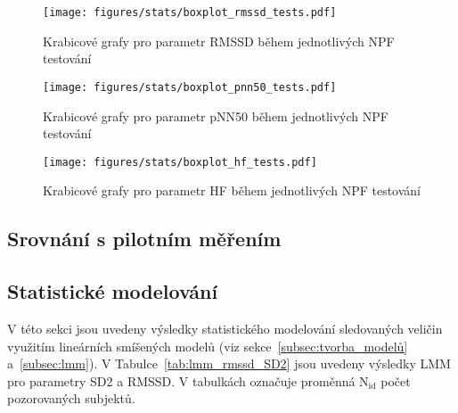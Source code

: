 \begin{figure}[H]
    \begin{center}
        \texttt{[image: figures/stats/boxplot\_rmssd\_tests.pdf]}
        \caption{Krabicové grafy pro parametr RMSSD během jednotlivých NPF testování}
        \label{fig:results_boxplot_rmssd_tests}
    \end{center}
    \vspace{-12mm}
\end{figure}
\begin{figure}[H]
    \begin{center}
        \texttt{[image: figures/stats/boxplot\_pnn50\_tests.pdf]}
        \caption{Krabicové grafy pro parametr pNN50 během jednotlivých NPF testování}
        \label{fig:results_boxplot_pnn50_tests}
    \end{center}
    \vspace{-12mm}
\end{figure}
\begin{figure}[H]
    \begin{center}
        \texttt{[image: figures/stats/boxplot\_hf\_tests.pdf]}
        \caption{Krabicové grafy pro parametr HF během jednotlivých NPF testování}
        \label{fig:results_boxplot_hf_tests}
    \end{center}
    \vspace{-20mm}
\end{figure}

\subsection{Srovnání s pilotním měřením}
\label{sec:result_pilot}

\subsection{Statistické modelování}
\label{sec:vysledky_lmm}
V této sekci jsou uvedeny výsledky statistického modelování sledovaných veličin
využitím lineárních smíšených modelů (viz sekce~\ref{subsec:tvorba_modelů}
a~\ref{subsec:lmm}). V Tabulce~\ref{tab:lmm_rmssd_SD2} jsou uvedeny výsledky
\gls{LMM} pro parametry SD2 a RMSSD. V tabulkách označuje proměnná
$\mathrm{N}_{\text{id}}$ počet pozorovaných subjektů. 

